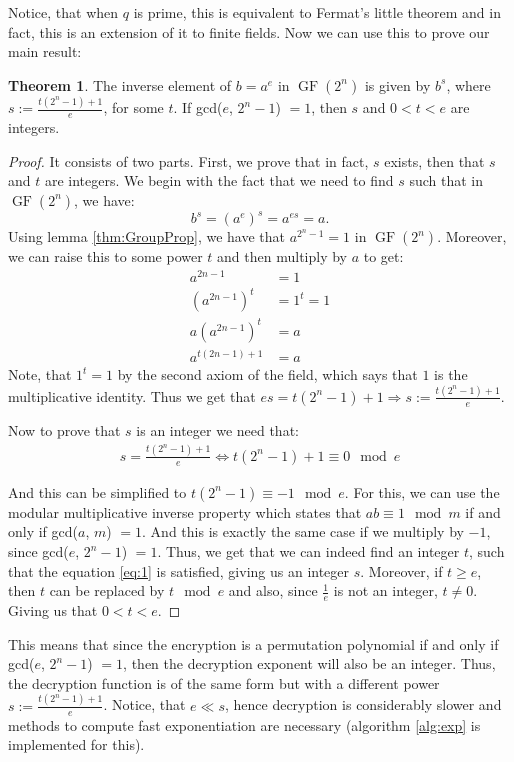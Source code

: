 \documentclass{Resources/UoBLab1}
\theoremstyle{definition}
\newtheorem{theorem}{Theorem}[section]
\begin{document}
Notice, that when $q$ is prime, this is equivalent to Fermat's little theorem and in fact, this is an extension of it to finite fields. Now we can use this to prove our main result:
\begin{theorem}
    The inverse element of $b = a^e$ in $\operatorname{GF}(2^n)$ is given by $b^s$, where $s := \frac{t(2^n-1) + 1}{e}$, for some $t$. If gcd($e$, $2^n-1$) $= 1$, then $s$ and $0 < t < e$ are integers.
\end{theorem}
\begin{proof}
    It consists of two parts. First, we prove that in fact, $s$ exists, then that $s$ and $t$ are integers. We begin with the fact that we need to find $s$ such that in $\operatorname{GF}(2^n)$, we have:
    \[
        b^s = (a^e)^s = a^{es} = a.
    \]
    Using lemma \ref{thm:GroupProp}, we have that $a^{2^n-1} = 1$ in $\operatorname{GF}(2^n)$. Moreover, we can raise this to some power $t$ and then multiply by $a$ to get:
    \begin{align*}
        a^{2n-1} &= 1\\
        (a^{2n-1}) ^ t &= 1^t = 1\\
        a (a^{2n-1})^t &= a\\
        a^{t(2n-1)+1} &= a
    \end{align*}
    Note, that $1^t=1$ by the second axiom of the field, which says that $1$ is the multiplicative identity. Thus we get that \(es = t(2^n-1)+1 \Rightarrow s := \frac{t(2^n-1)+1}{e}\).\medskip

    \noindent Now to prove that $s$ is an integer we need that:
    \begin{equation}
        \begin{array}{c}
            s = \frac{t(2^n-1) + 1}{e} \iff t(2^n-1) + 1 \equiv 0 \mod e
        \end{array}\label{eq:1}
    \end{equation}

    \noindent And this can be simplified to \(t(2^n-1) \equiv -1 \mod e\). For this, we can use the modular multiplicative inverse property which states that $ab \equiv 1 \mod m$ if and only if gcd($a$, $m$) $= 1$. And this is exactly the same case if we multiply by $-1$, since gcd($e$, $2^n-1$) $= 1$. Thus, we get that we can indeed find an integer $t$, such that the equation \eqref{eq:1} is satisfied, giving us an integer $s$. Moreover, if $t \ge e$, then $t$ can be replaced by $t \mod e$ and also, since $\frac{1}{e}$ is not an integer, $t \ne 0$. Giving us that $0 < t < e$.
\end{proof}
This means that since the encryption is a permutation polynomial if and only if gcd($e$, $2^n-1$) $= 1$, then the decryption exponent will also be an integer. Thus, the decryption function is of the same form but with a different power $s := \frac{t(2^n-1)+1}{e}$. Notice, that $e \ll s$, hence decryption is considerably slower and methods to compute fast exponentiation are necessary (algorithm \ref{alg:exp} is implemented for this).
\end{document}
